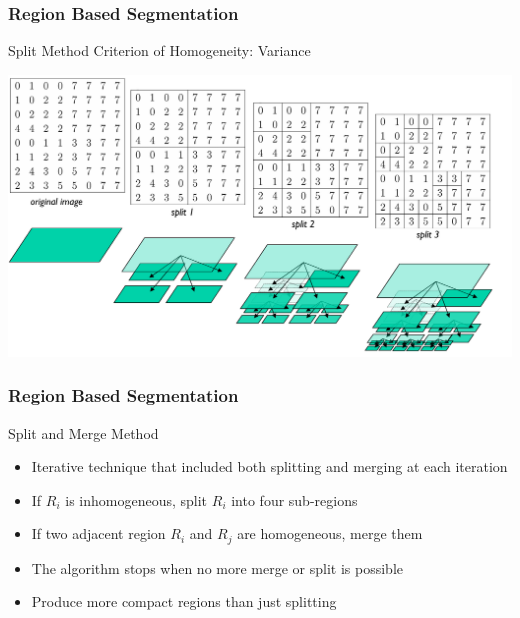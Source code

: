 \documentclass{beamer}
\begin{document}
\begin{frame}
\frametitle{Region Based Segmentation}
\begin{block}{Split Method}
\scriptsize{Criterion of Homogeneity: Variance}
\begin{center}
\includegraphics[scale=0.3]{images/L8_Split3.png}
\end{center}
\end{block}
\end{frame}

\begin{frame}
\frametitle{Region Based Segmentation}
\begin{block}{Split and Merge Method}
\begin{itemize}
\item Iterative technique that included both splitting and merging at each iteration
\item If $R_{i}$ is inhomogeneous, split $R_{i}$ into four sub-regions
\item If two adjacent region $R_{i}$ and $R_{j}$ are homogeneous, merge them 
\item The algorithm stops when no more merge or split is possible 
\item {\color{green} Produce more compact regions than just splitting}
\end{itemize}
\end{block}
\end{frame}
\end{document}

